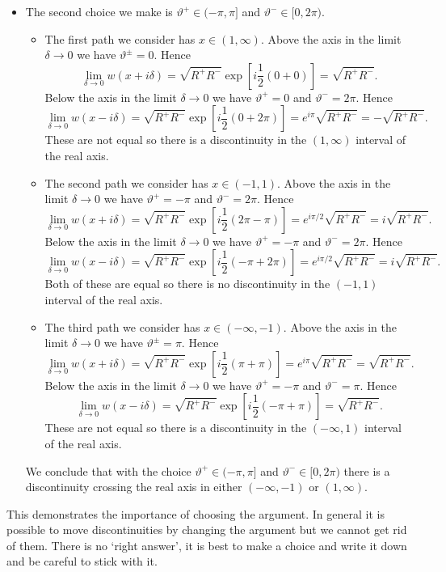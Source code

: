 \documentclass{article}
\begin{document}
\begin{itemize}
        \item The second choice we make is \(\vartheta^+\in(-\pi, \pi]\) and \(\vartheta^-\in[0, 2\pi)\).
        \begin{itemize}
            \item The first path we consider has \(x \in (1, \infty)\).
            \subitem Above the axis in the limit \(\delta \to 0\) we have \(\vartheta^{\pm} = 0\).
            Hence
            \[\lim_{\delta\to 0} w(x + i\delta) = \sqrt{R^+R^-}\exp\left[i\frac{1}{2}(0 + 0)\right] = \sqrt{R^+R^-}.\]
            \subitem Below the axis in the limit \(\delta \to 0\) we have \(\vartheta^+ = 0\) and \(\vartheta^- = 2\pi\).
            Hence
            \[\lim_{\delta\to 0} w(x - i\delta) = \sqrt{R^+R^-}\exp\left[i\frac{1}{2}(0 + 2\pi)\right] = e^{i\pi}\sqrt{R^+R^-} = -\sqrt{R^+R^-}.\]
            These are not equal so there is a discontinuity in the \((1, \infty)\) interval of the real axis.
            
            \item The second path we consider has \(x\in(-1, 1)\).
            \subitem Above the axis in the limit \(\delta \to 0\) we have \(\vartheta^+ = -\pi\) and \(\vartheta^- = 2\pi\).
            Hence
            \[\lim_{\delta\to 0} w(x + i\delta) = \sqrt{R^+R^-}\exp\left[i\frac{1}{2}(2\pi - \pi)\right] = e^{i\pi/2}\sqrt{R^+R^-} = i\sqrt{R^+R^-}.\]
            \subitem Below the axis in the limit \(\delta \to 0\) we have \(\vartheta^+ = -\pi\) and \(\vartheta^- = 2\pi\).
            Hence
            \[\lim_{\delta\to 0} w(x - i\delta) = \sqrt{R^+R^-}\exp\left[i\frac{1}{2}(-\pi + 2\pi)\right] = e^{i\pi/2}\sqrt{R^+R^-} = i\sqrt{R^+R^-}.\]
            Both of these are equal so there is no discontinuity in the \((-1, 1)\) interval of the real axis.
            
            \item The third path we consider has \(x\in(-\infty, -1)\).
            \subitem Above the axis in the limit \(\delta \to 0\) we have \(\vartheta^{\pm} = \pi\).
            Hence
            \[\lim_{\delta\to 0} w(x + i\delta) = \sqrt{R^+R^-}\exp\left[i\frac{1}{2}(\pi + \pi)\right] = e^{i\pi}\sqrt{R^+R^-} = \sqrt{R^+R^-}.\]
            \subitem Below the axis in the limit \(\delta \to 0\) we have \(\vartheta^+ = -\pi\) and \(\vartheta^- = \pi\).
            Hence
            \[\lim_{\delta\to 0} w(x - i\delta) = \sqrt{R^+R^-}\exp\left[i\frac{1}{2}(-\pi + \pi)\right] = \sqrt{R^+R^-}.\]
            These are not equal so there is a discontinuity in the \((-\infty, 1)\) interval of the real axis.
        \end{itemize}
        We conclude that with the choice \(\vartheta^+\in(-\pi, \pi]\) and \(\vartheta^-\in[0, 2\pi)\) there is a discontinuity crossing the real axis in either \((-\infty, -1)\) or \((1, \infty)\).
    \end{itemize}
    This demonstrates the importance of choosing the argument.
    In general it is possible to move discontinuities by changing the argument but we cannot get rid of them.
    There is no `right answer', it is best to make a choice and write it down and be careful to stick with it.
    
\end{document}
